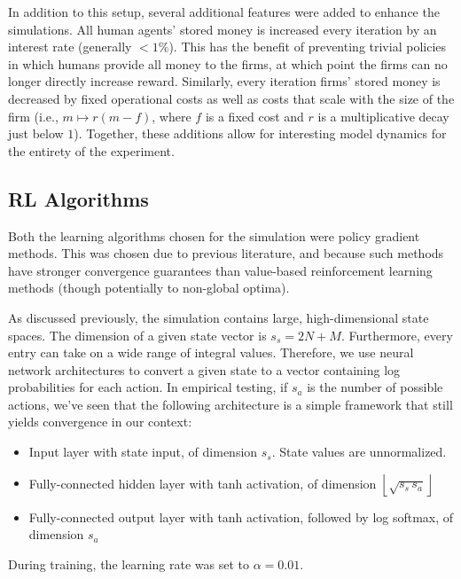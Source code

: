 \documentclass[twoside,twocolumn]{article}
\begin{document}
\medskip

In addition to this setup, several additional features were added to enhance the simulations. All human agents' stored money is increased every iteration by an interest rate (generally $<1\%$). This has the benefit of preventing trivial policies in which humans provide all money to the firms, at which point the firms can no longer directly increase reward. Similarly, every iteration firms' stored money is decreased by fixed operational costs as well as costs that scale with the size of the firm (i.e., $m \mapsto r(m - f)$, where $f$ is a fixed cost and $r$ is a multiplicative decay just below $1$). Together, these additions allow for interesting model dynamics for the entirety of the experiment.


\subsection{RL Algorithms}
Both the learning algorithms chosen for the simulation were policy gradient methods. This was chosen due to previous literature, and because such methods have stronger convergence guarantees than value-based reinforcement learning methods (though potentially to non-global optima).

\medskip

As discussed previously, the simulation contains large, high-dimensional state spaces. The dimension of a given state vector is $s_s = 2 N + M$. Furthermore, every entry can take on a wide range of integral values. Therefore, we use neural network architectures to convert a given state to a vector containing log probabilities for each action. In empirical testing, if $s_a$ is the number of possible actions, we've seen that the following architecture is a simple framework that still yields convergence in our context:
\begin{itemize}
  \item Input layer with state input, of dimension $s_s$. State values are unnormalized.
  \item Fully-connected hidden layer with tanh activation, of dimension $\left\lfloor \sqrt{s_s \, s_a} \right\rfloor$
  \item Fully-connected output layer with tanh activation, followed by log softmax, of dimension $s_a$
\end{itemize}
During training, the learning rate was set to $\alpha = 0.01$. 
\end{document}
